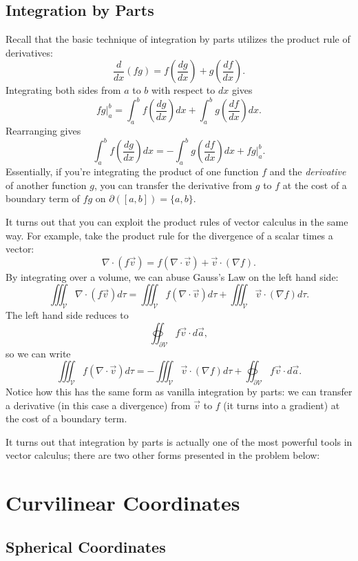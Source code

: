 \subsection{Integration by Parts}

Recall that the basic technique of integration by parts utilizes the product rule of derivatives:
\[\frac{d}{dx}(fg)=f\left(\frac{dg}{dx}\right)+g\left(\frac{df}{dx}\right).\]
Integrating both sides from $a$ to $b$ with respect to $dx$ gives
\[\left.fg\right\rvert_{a}^b=\int_a^bf\left(\frac{dg}{dx}\right)dx+\int_a^bg\left(\frac{df}{dx}\right)dx.\]
Rearranging gives
\[\boxed{\int_a^bf\left(\frac{dg}{dx}\right)dx=-\int_a^bg\left(\frac{df}{dx}\right)dx+\left.fg\right\rvert_a^b}.\]
Essentially, if you're integrating the product of one function $f$ and the \textit{derivative} of another function $g$, you can transfer the derivative from $g$ to $f$ at the cost of a boundary term of $fg$ on $\partial([a,b])=\{a,b\}$.

It turns out that you can exploit the product rules of vector calculus in the same way. For example, take the product rule for the divergence of a scalar times a vector:
\[\nabla\cdot(f\vec{v})=f(\nabla\cdot \vec{v})+\vec{v}\cdot(\nabla f).\]
By integrating over a volume, we can abuse Gauss's Law on the left hand side:
\[\iiint_{\mathcal{V}}\nabla\cdot(f\vec{v})d\tau=\iiint_{\mathcal{V}}f(\nabla\cdot \vec{v})d\tau+\iiint_{\mathcal{V}}\vec{v}\cdot(\nabla f)d\tau.\]
The left hand side reduces to
\[\oiint_{\partial\mathcal{V}}f\vec{v}\cdot d\vec{a},\]
so we can write
\[\boxed{\iiint_{\mathcal{V}}f(\nabla\cdot\vec{v})d\tau=-\iiint_{\mathcal{V}}\vec{v}\cdot(\nabla f)d\tau+\oiint_{\partial\mathcal{V}}f\vec{v}\cdot d\vec{a}}.\]
Notice how this has the same form as vanilla integration by parts: we can transfer a derivative (in this case a divergence) from $\vec{v}$ to $f$ (it turns into a gradient) at the cost of a boundary term.

It turns out that integration by parts is actually one of the most powerful tools in vector calculus; there are two other forms presented in the problem below:

\section{Curvilinear Coordinates}

\subsection{Spherical Coordinates}

